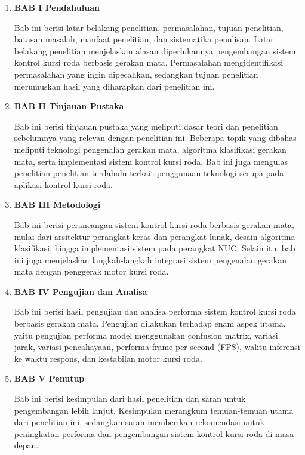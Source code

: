 \begin{enumerate}[nolistsep]

  \item \textbf{BAB I Pendahuluan}

        Bab ini berisi latar belakang penelitian, permasalahan, tujuan penelitian, batasan masalah, manfaat penelitian, dan sistematika penulisan. Latar belakang penelitian menjelaskan alasan diperlukannya pengembangan sistem kontrol kursi roda berbasis gerakan mata. Permasalahan mengidentifikasi permasalahan yang ingin dipecahkan, sedangkan tujuan penelitian merumuskan hasil yang diharapkan dari penelitian ini.

        \vspace{2ex}

  \item \textbf{BAB II Tinjauan Pustaka}

        Bab ini berisi tinjauan pustaka yang meliputi dasar teori dan penelitian sebelumnya yang relevan dengan penelitian ini. Beberapa topik yang dibahas meliputi teknologi pengenalan gerakan mata, algoritma klasifikasi gerakan mata, serta implementasi sistem kontrol kursi roda. Bab ini juga mengulas penelitian-penelitian terdahulu terkait penggunaan teknologi serupa pada aplikasi kontrol kursi roda.

        \vspace{2ex}

  \item \textbf{BAB III Metodologi}

        Bab ini berisi perancangan sistem kontrol kursi roda berbasis gerakan mata, mulai dari arsitektur perangkat keras dan perangkat lunak, desain algoritma klasifikasi, hingga implementasi sistem pada perangkat NUC. Selain itu, bab ini juga menjelaskan langkah-langkah integrasi sistem pengenalan gerakan mata dengan penggerak motor kursi roda.

        \vspace{2ex}

  \item \textbf{BAB IV Pengujian dan Analisa}

        Bab ini berisi hasil pengujian dan analisa performa sistem kontrol kursi roda berbasis gerakan mata. Pengujian dilakukan terhadap enam aspek utama, yaitu pengujian performa model menggunakan confusion matrix, variasi jarak, variasi pencahayaan, performa frame per second (FPS), waktu inferensi ke waktu respons, dan kestabilan motor kursi roda.

        \vspace{2ex}

  \item \textbf{BAB V Penutup}

        Bab ini berisi kesimpulan dari hasil penelitian dan saran untuk pengembangan lebih lanjut. Kesimpulan merangkum temuan-temuan utama dari penelitian ini, sedangkan saran memberikan rekomendasi untuk peningkatan performa dan pengembangan sistem kontrol kursi roda di masa depan.

\end{enumerate}